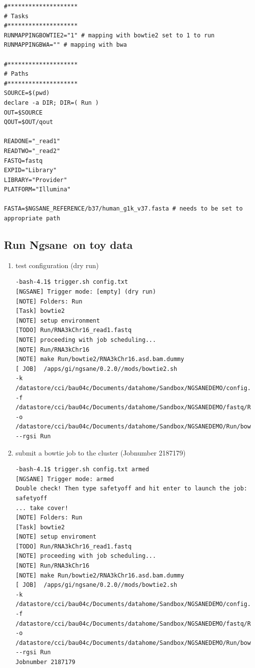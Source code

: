 \documentclass{article}
\newcommand{\prog}{{\sc Ngsane}}
\begin{document}
\begin{enumerate}
\begin{small}
\begin{verbatim}
#********************
# Tasks
#********************
RUNMAPPINGBOWTIE2="1" # mapping with bowtie2 set to 1 to run
RUNMAPPINGBWA="" # mapping with bwa

#********************
# Paths
#********************
SOURCE=$(pwd)
declare -a DIR; DIR=( Run )
OUT=$SOURCE
QOUT=$OUT/qout

READONE="_read1"
READTWO="_read2"
FASTQ=fastq
EXPID="Library"
LIBRARY="Provider"
PLATFORM="Illumina"

FASTA=$NGSANE_REFERENCE/b37/human_g1k_v37.fasta # needs to be set to appropriate path

\end{verbatim}\end{small}
\end{enumerate}

\subsection{Run \prog\ on toy data}
\begin{enumerate}
\item test configuration (dry run)
\begin{small}\begin{verbatim}
-bash-4.1$ trigger.sh config.txt
[NGSANE] Trigger mode: [empty] (dry run)
[NOTE] Folders: Run
[Task] bowtie2
[NOTE] setup environment
[TODO] Run/RNA3kChr16_read1.fastq
[NOTE] proceeding with job scheduling...
[NOTE] Run/RNA3kChr16
[NOTE] make Run/bowtie2/RNA3kChr16.asd.bam.dummy
[ JOB]  /apps/gi/ngsane/0.2.0//mods/bowtie2.sh 
-k /datastore/cci/bau04c/Documents/datahome/Sandbox/NGSANEDEMO/config.txt 
-f /datastore/cci/bau04c/Documents/datahome/Sandbox/NGSANEDEMO/fastq/Run/RNA3kChr16_read1.fastq 
-o /datastore/cci/bau04c/Documents/datahome/Sandbox/NGSANEDEMO/Run/bowtie2 --rgsi Run
\end{verbatim}\end{small}
\item submit a bowtie job to the cluster (Jobnumber 2187179)
\begin{small}\begin{verbatim}
-bash-4.1$ trigger.sh config.txt armed
[NGSANE] Trigger mode: armed
Double check! Then type safetyoff and hit enter to launch the job: safetyoff
... take cover!
[NOTE] Folders: Run
[Task] bowtie2
[NOTE] setup enviroment
[TODO] Run/RNA3kChr16_read1.fastq
[NOTE] proceeding with job scheduling...
[NOTE] Run/RNA3kChr16
[NOTE] make Run/bowtie2/RNA3kChr16.asd.bam.dummy
[ JOB]  /apps/gi/ngsane/0.2.0//mods/bowtie2.sh 
-k /datastore/cci/bau04c/Documents/datahome/Sandbox/NGSANEDEMO/config.txt 
-f /datastore/cci/bau04c/Documents/datahome/Sandbox/NGSANEDEMO/fastq/Run/RNA3kChr16_read1.fastq 
-o /datastore/cci/bau04c/Documents/datahome/Sandbox/NGSANEDEMO/Run/bowtie2 --rgsi Run
Jobnumber 2187179
\end{verbatim}\end{small}
\end{enumerate}
\end{document}
